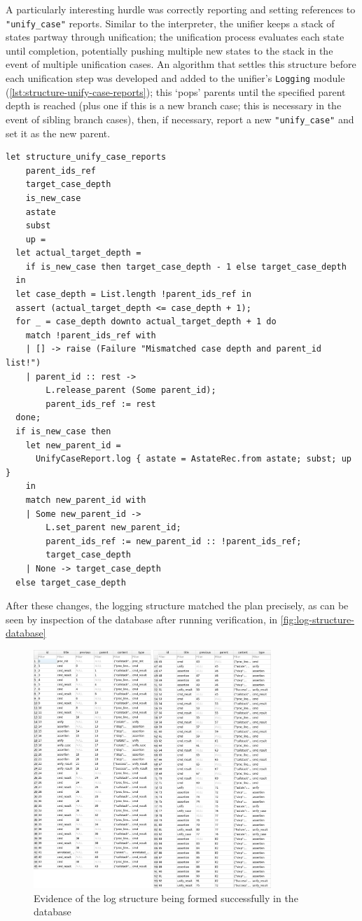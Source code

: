 A particularly interesting hurdle was correctly reporting and setting references
to \texttt{"unify\_case"} reports. Similar to the interpreter, the unifier keeps
a stack of states partway through unification; the unification process evaluates
each state until completion, potentially pushing multiple new states to the
stack in the event of multiple unification cases. An algorithm that settles this
structure before each unification step was developed and added to the unifier's
\texttt{Logging} module (\autoref{lst:structure-unify-case-reports}); this
`pops' parents until the specified parent depth is reached (plus one if this
is a new branch case; this is necessary in the event of sibling branch cases),
then, if necessary, report a new \texttt{"unify\_case"} and set it as the new
parent.

\begin{lstlisting}[caption={
  The function for settling the log structure for \texttt{unify\_case} reports
  \label{lst:structure-unify-case-reports}}, style=code, numbers=none]
let structure_unify_case_reports
    parent_ids_ref
    target_case_depth
    is_new_case
    astate
    subst
    up =
  let actual_target_depth =
    if is_new_case then target_case_depth - 1 else target_case_depth
  in
  let case_depth = List.length !parent_ids_ref in
  assert (actual_target_depth <= case_depth + 1);
  for _ = case_depth downto actual_target_depth + 1 do
    match !parent_ids_ref with
    | [] -> raise (Failure "Mismatched case depth and parent_id list!")
    | parent_id :: rest ->
        L.release_parent (Some parent_id);
        parent_ids_ref := rest
  done;
  if is_new_case then
    let new_parent_id =
      UnifyCaseReport.log { astate = AstateRec.from astate; subst; up }
    in
    match new_parent_id with
    | Some new_parent_id ->
        L.set_parent new_parent_id;
        parent_ids_ref := new_parent_id :: !parent_ids_ref;
        target_case_depth
    | None -> target_case_depth
  else target_case_depth
\end{lstlisting}

After these changes, the logging structure matched the plan precisely, as can be
seen by inspection of the database after running verification, in
\autoref{fig:log-structure-database}

\begin{figure}
  \center{}
  \includegraphics[width=0.8\textwidth]{img/log-structure-database.png}
  \caption{
    Evidence of the log structure being formed successfully in the database}%
  \label{fig:log-structure-database}
\end{figure}
